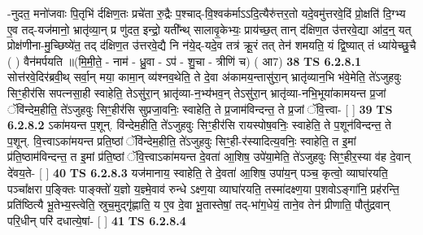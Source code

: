 \documentclass[17pt]{extarticle}
\begin{document}
                  -नुदत॒ मनो॑जवाः पि॒तृभि॑ र्दक्षिण॒तः प्रचे॑ता रु॒द्रैः प॒श्चाद्-वि॒श्वक॑र्माऽऽदि॒त्यैरु॑त्तर॒तो यदे॒वमु॑त्तरवे॒दिं प्रो॒क्षति॑ दि॒ग्भ्य ए॒व तद्-यज॑मानो॒ भ्रातृ॑व्या॒न् प्र णु॑दत॒ इन्द्रो॒ यती᳚न्थ् सालावृ॒केभ्यः॒ प्राय॑च्छ॒त् तान् द॑क्षिण॒त उ॑त्तरवे॒द्या आ॑द॒न्॒ यत् प्रोक्ष॑णीना-मु॒च्छिष्ये॑त॒ तद् द॑क्षिण॒त उ॑त्तरवे॒द्यै नि न॑ये॒द्-यदे॒व तत्र॑ क्रू॒रं तत् तेन॑ शमयति॒ यं द्वि॒ष्यात् तं ध्या॑येच्छु॒चै ( ) वैन॑मर्पयति ॥(मि॒मी॒ते॒ - नाम॑ - ध्रु॒वा - ऽप॑ - शु॒चा - त्रीणि॑ च) ( आ7) \textbf{  38} \newline
                  \newline
                       \textbf{} \newline \newline
                                        \textbf{ TS 6.2.8.1} \newline
                  सोत्त॑रवे॒दिर॑ब्रवी॒थ् सर्वा॒न् मया॒ कामा॒न् व्य॑श्नव॒थेति॒ ते दे॒वा अ॑कामय॒न्तासु॑रा॒न् भ्रातृ॑व्यान॒भि भ॑वे॒मेति॒ ते॑ऽजुहवुः सिꣳ॒॒हीर॑सि सपत्नसा॒ही स्वाहेति॒ तेऽसु॑रा॒न् भ्रातृ॑व्या-न॒भ्य॑भव॒न् तेऽसु॑रा॒न् भ्रातृ॑व्या-नभि॒भूया॑कामयन्त प्र॒जां ॅवि॑न्देम॒हीति॒ ते॑ऽजुहवुः सिꣳ॒॒हीर॑सि सुप्रजा॒वनिः॒ स्वाहेति॒ ते प्र॒जाम॑विन्दन्त॒ ते प्र॒जां ॅवि॒त्त्वा- [  ] \textbf{  39} \newline
                  \newline
                                \textbf{ TS 6.2.8.2} \newline
                  ऽका॑मयन्त प॒शून्. वि॑न्देम॒हीति॒ ते॑ऽजुहवुः सिꣳ॒॒हीर॑सि रायस्पोष॒वनिः॒ स्वाहेति॒ ते प॒शून॑विन्दन्त॒ ते प॒शून्. वि॒त्त्वाऽका॑मयन्त प्रति॒ष्ठां ॅवि॑न्देम॒हीति॒ ते॑ऽजुहवुः सिꣳ॒॒ही-र॑स्यादित्य॒वनिः॒ स्वाहेति॒ त इ॒मां प्र॑ति॒ष्ठाम॑विन्दन्त॒ त इ॒मां प्र॑ति॒ष्ठां ॅवि॒त्त्वाऽका॑मयन्त दे॒वता॑ आ॒शिष॒ उपे॑या॒मेति॒ ते॑ऽजुहवुः सिꣳ॒॒हीर॒स्या व॑ह दे॒वान् दे॑वय॒ते- [  ] \textbf{  40} \newline
                  \newline
                                \textbf{ TS 6.2.8.3} \newline
                  यज॑मानाय॒ स्वाहेति॒ ते दे॒वता॑ आ॒शिष॒ उपा॑य॒न् पञ्च॒ कृत्वो॒ व्याघा॑रयति॒ पञ्चा᳚क्षरा प॒ङ्क्तिः पाङ्क्तो॑ य॒ज्ञो य॒ज्ञ्मे॒वाव॑ रुन्धे ऽक्ष्ण॒या व्याघा॑रयति॒ तस्मा॑दक्ष्ण॒या प॒शवोऽङ्गा॑नि॒ प्रह॑रन्ति॒ प्रति॑ष्ठित्यै भू॒तेभ्य॒स्त्वेति॒ स्रुच॒मुद्गृ॑ह्णाति॒ य ए॒व दे॒वा भू॒तास्तेषां॒ तद्-भा॑ग॒धेयं॒ ताने॒व तेन॑ प्रीणाति॒ पौतु॑द्रवान् परि॒धीन् परि॑ दधात्ये॒षां- [  ] \textbf{  41} \newline
                  \newline
                                \textbf{ TS 6.2.8.4} \newline
\end{document}
